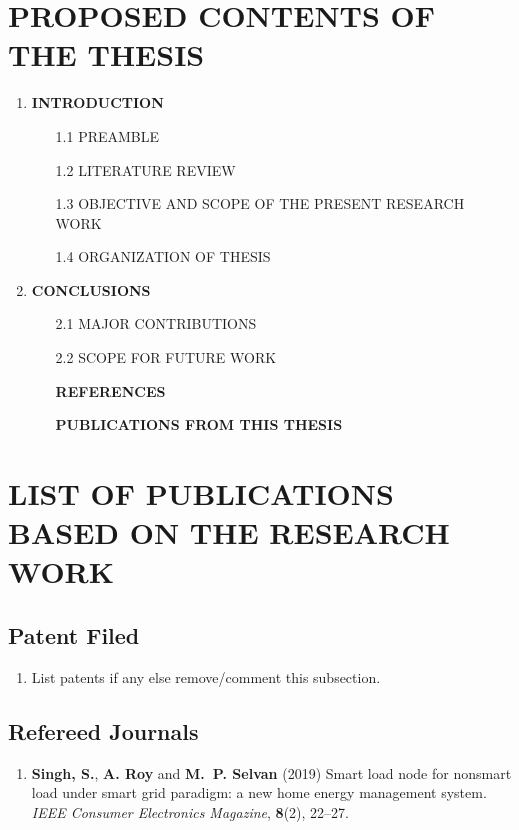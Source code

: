 \documentclass[12pt,a4paper, twoside]{report}
\begin{document}
\section{PROPOSED CONTENTS OF THE THESIS}
\begin{enumerate}[labelwidth=2.4cm,labelindent=15pt,leftmargin=2.5cm,label=\bfseries CHAPTER \arabic*,align=left]
\setlength\itemsep{-0.2em}
\item {\bf INTRODUCTION \rm}
\begin{itemize}[leftmargin=10pt]
\setlength\itemsep{-0.2em}
	\item[1.1]	PREAMBLE
	\item[1.2]	LITERATURE REVIEW
	\item[1.3]	OBJECTIVE AND SCOPE OF THE PRESENT RESEARCH WORK
	\item[1.4] 	ORGANIZATION OF THESIS 
\end{itemize}
\item {\bf CONCLUSIONS \rm}
\begin{itemize}[leftmargin=10pt]
	\item[2.1]	MAJOR CONTRIBUTIONS
	\item[2.2]	SCOPE FOR FUTURE WORK
\end{itemize}
\begin{itemize}[leftmargin=-2.5cm]
\setlength\itemsep{-0.2em}
\item[]{\bf REFERENCES \rm}
\item[]{\bf PUBLICATIONS FROM THIS THESIS \rm}
\end{itemize}
\end{enumerate}

\section{LIST OF PUBLICATIONS BASED ON THE RESEARCH WORK}
\subsection*{Patent Filed}
\begin{enumerate}
\item List patents if any else remove/comment this subsection.    
\end{enumerate}

\subsection*{Refereed Journals}
\begin{enumerate}
\item \textbf{Singh, S.}, \textbf{A. Roy} and \textbf{M.~P. Selvan} (2019) Smart load node for nonsmart load under smart grid paradigm: a new home energy management system. \textit{IEEE Consumer Electronics Magazine}, \textbf{8}(2), 22--27.
\end{enumerate}
\end{document}
